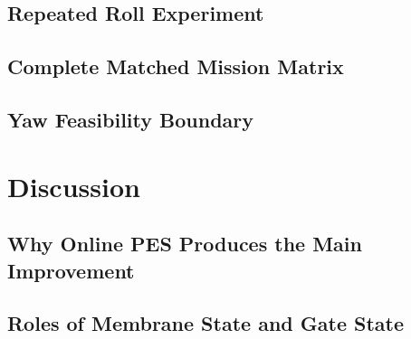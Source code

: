 \documentclass[letterpaper,10pt,conference]{ieeeconf}
\begin{document}

\subsection{Repeated Roll Experiment}


\subsection{Complete Matched Mission Matrix}


\subsection{Yaw Feasibility Boundary}


\section{Discussion}
\label{sec:discussion}

\subsection{Why Online PES Produces the Main Improvement}


\subsection{Roles of Membrane State and Gate State}

\end{document}
